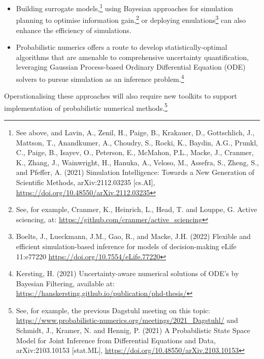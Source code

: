 {{\begin{itemize}
{    \uline{\url{https://doi.org/10.48550/arXiv.1903.00007}}}
\item
  Building surrogate models,\footnote{See above, and Lavin, A., Zenil,
    H., Paige, B., Krakauer, D., Gottschlich, J., Mattson, T.,
    Anandkumer, A., Choudry, S., Rocki, K., Baydin, A.G., Prunkl, C.,
    Paige, B., Isayev, O., Peterson, E., McMahon, P.L., Macke, J.,
    Cranmer, K., Zhang, J., Wainwright, H., Hanuka, A., Veloso, M.,
    Assefra, S., Zheng, S., and Pfeffer, A. (2021) Simulation
    Intelligence: Towards a New Generation of Scientific Methods,
    arXiv:2112.03235 {[}cs.AI{]},
    \href{https://doi.org/10.48550/arXiv.2112.03235}{\hfill\break
    \uline{https://doi.org/10.48550/arXiv.2112.03235}}} using Bayesian
  approaches for simulation planning to optimise information
  gain,\footnote{See, for example, Cranmer, K., Heinrich, L., Head, T.
    and Louppe, G. Active sciencing, at:
    \href{https://github.com/cranmer/active_sciencing}{\uline{https://github.com/cranmer/active\_sciencing}}}
  or deploying emulations\footnote{Boelts, J., Lueckmann, J.M., Gao, R.,
    and Macke, J.H. (2022) Flexible and efficient simulation-based
    inference for models of decision-making eLife 11:e77220
    \href{https://doi.org/10.7554/eLife.77220}{\uline{https://doi.org/10.7554/eLife.77220}}}
  can also enhance the efficiency of simulations.
\item
  Probabilistic numerics offers a route to develop statistically-optimal
  algorithms that are amenable to comprehensive uncertainty
  quantification, leveraging Gaussian Process-based Ordinary
  Differential Equation (ODE) solvers to pursue simulation as an
  inference problem.\footnote{Kersting, H. (2021) Uncertainty-aware
    numerical solutions of ODE's by Bayesian Filtering, available at:
    \href{https://hanskersting.github.io/publication/phd-thesis/}{\uline{https://hanskersting.github.io/publication/phd-thesis/}}}
\end{itemize}

Operationalising these approaches will also require new toolkits to
support implementation of probabilistic numerical methods.\footnote{See,
  for example, the previous Dagstuhl meeting on this topic:
  \href{https://www.probabilistic-numerics.org/meetings/2021_Dagstuhl/}{\uline{https://www.probabilistic-numerics.org/meetings/2021\_Dagstuhl/}}
  and Schmidt, J., Kramer, N. and Hennig, P. (2021) A Probabilistic
  State Space Model for Joint Inference from Differential Equations and
  Data, arXiv:2103.10153 {[}stat.ML{]},
  \href{https://doi.org/10.48550/arXiv.2103.10153}{\uline{https://doi.org/10.48550/arXiv.2103.10153}}}

}}
